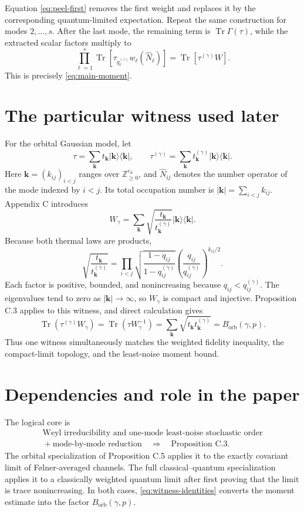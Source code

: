 \documentclass[11pt]{article}
\newcommand{\Tr}{\operatorname{Tr}}
\newcommand{\ketbra}[1]{|#1\rangle\!\langle #1|}
\newcommand{\Borb}{B_{\mathrm{orb}}}
\begin{document}
Equation \eqref{eq:peel-first} removes the first weight and replaces it by
the corresponding quantum-limited expectation.  Repeat the same construction
for modes $2,\ldots,s$.  After the last mode, the remaining term is
$\Tr\Gamma(\tau)$, while the extracted scalar factors multiply to
\[
  \prod_{\ell=1}^s
  \Tr[\tau_{q_\ell^{(\gamma)}}w_\ell(\widehat N_\ell)]
  =\Tr[\tau^{(\gamma)}W].
\]
This is precisely \eqref{eq:main-moment}.

\section{The particular witness used later}

For the orbital Gaussian model, let
\[
  \tau=\sum_{\mathbf k}t_{\mathbf k}\ketbra{\mathbf k},
  \qquad
  \tau^{(\gamma)}
  =\sum_{\mathbf k}t_{\mathbf k}^{(\gamma)}\ketbra{\mathbf k}.
\]
Here $\mathbf k=(k_{ij})_{i<j}$ ranges over
$\mathbb Z_{\geq0}^{r_d}$, and $\widehat N_{ij}$ denotes the number operator
of the mode indexed by $i<j$.  Its total occupation number is
$|\mathbf k|=\sum_{i<j}k_{ij}$.
Appendix C introduces
\begin{equation}\label{eq:Wgamma}
  W_\gamma
  =\sum_{\mathbf k}
    \sqrt{\frac{t_{\mathbf k}}{t_{\mathbf k}^{(\gamma)}}}
    \ketbra{\mathbf k}.
\end{equation}
Because both thermal laws are products,
\[
  \sqrt{\frac{t_{\mathbf k}}{t_{\mathbf k}^{(\gamma)}}}
  =\prod_{i<j}
  \sqrt{\frac{1-q_{ij}}{1-q_{ij}^{(\gamma)}}}
  \left(\frac{q_{ij}}{q_{ij}^{(\gamma)}}\right)^{k_{ij}/2}.
\]
Each factor is positive, bounded, and nonincreasing because
$q_{ij}<q_{ij}^{(\gamma)}$.  The eigenvalues tend to zero as
$|\mathbf k|\to\infty$, so $W_\gamma$ is compact and injective.
Proposition C.3 applies to this witness, and direct calculation gives
\begin{equation}\label{eq:witness-identities}
  \Tr(\tau^{(\gamma)}W_\gamma)
  =\Tr(\tau W_\gamma^{-1})
  =\sum_{\mathbf k}\sqrt{t_{\mathbf k}t_{\mathbf k}^{(\gamma)}}
  =\Borb(\gamma,p).
\end{equation}
Thus one witness simultaneously matches the weighted fidelity inequality,
the compact-limit topology, and the least-noise moment bound.

\section{Dependencies and role in the paper}

The logical core is
\[
  \begin{gathered}
  \text{Weyl irreducibility and one-mode least-noise stochastic order}\\
  {}+\text{mode-by-mode reduction}
  \quad\Longrightarrow\quad\text{Proposition C.3}.
  \end{gathered}
\]
The orbital specialization of Proposition C.5 applies it to the exactly
covariant limit of F\o lner-averaged channels.  The full classical--quantum
specialization applies it to a classically weighted quantum limit after first
proving that the limit is trace nonincreasing.  In both cases,
\eqref{eq:witness-identities} converts the moment estimate into the factor
$\Borb(\gamma,p)$.
\end{document}
